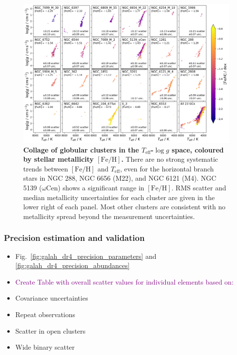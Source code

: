 \documentclass[
  journal=pasa,
  manuscript=research-paper, %
  year=2023,
  volume=37
]{cup-journal}
\newcommand{\SB}[1]{{\textcolor{purple}{#1}}}
\newcommand{\Teff}{$T_\mathrm{eff}$\xspace}
\newcommand{\logg}{$\log g$\xspace}
\newcommand{\feh}{$\mathrm{[Fe/H]}$\xspace}
\begin{document}
\begin{landscape}
\begin{figure}
\includegraphics[width=0.975\columnwidth]{figures/galah_dr4_gcs_teff_logg.png}
\caption{
\textbf{Collage of globular clusters in the \Teff-\logg space, coloured by stellar metallicity \feh.} There are no strong systematic trends between \feh and \Teff, even for the horizontal branch stars in NGC 288, NGC 6656 (M22), and NGC 6121 (M4). NGC 5139 ($\mathrm{\omega}$Cen) shows a significant range in \feh. RMS scatter and median metallicity uncertainties for each cluster are given in the lower right of each panel. Most other clusters are consistent with no metallicity spread beyond the measurement uncertainties. 
}
\label{fig:galah_dr4_gcs_teff_logg}
\end{figure}
\end{landscape}


\subsubsection{Precision estimation and validation} \label{sec:uncertainty_precision}

\begin{itemize}
    \item Fig.~\ref{fig:galah_dr4_precision_parameters} and \ref{fig:galah_dr4_precision_abundances}
    \item \SB{Create Table with overall scatter values for individual elements based on:}
    \item Covariance uncertainties
    \item Repeat observations
    \item Scatter in open clusters
    \item Wide binary scatter
\end{itemize}
\end{document}
